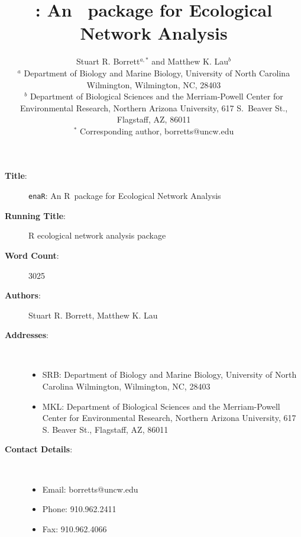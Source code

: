 \documentclass[11pt]{article}
\title{\enaR: An \R\ package for Ecological Network Analysis}
\author{Stuart R. Borrett$^{a,*}$ and Matthew K. Lau$^b$
  \\ {\footnotesize $^a$ Department of Biology and Marine Biology,
    University of North Carolina Wilmington, Wilmington, NC, 28403}
  \\ {\footnotesize $^b$ Department of Biological Sciences and the
    Merriam-Powell Center for Environmental Research, Northern Arizona
    University, 617 S.\ Beaver St., Flagstaff, AZ, 86011}
  \\ {\footnotesize $^*$ Corresponding author, borretts@uncw.edu} }
\newcommand{\R}{R}
\newcommand{\enaR}{\texttt{enaR}}
\begin{document}

\begin{description}
  \item[\textbf{Title}:] \enaR: An \R\ package for Ecological Network Analysis
  \item[\textbf{Running Title}:] R ecological network analysis package 
  \item[\textbf{Word Count}:] 3025
  \item[\textbf{Authors}:] Stuart R. Borrett, Matthew K. Lau
  \item[\textbf{Addresses}:] \
    \begin{itemize}
    \item SRB: Department of Biology and Marine Biology, University of
      North Carolina Wilmington, Wilmington, NC, 28403
    \item MKL: Department of Biological Sciences and the
      Merriam-Powell Center for Environmental Research, Northern
      Arizona University, 617 S. Beaver St., Flagstaff, AZ, 86011
    \end{itemize}
  \item[\textbf{Contact Details}:] \
    \begin{itemize}
    \item Email: borretts@uncw.edu
    \item Phone: 910.962.2411
    \item Fax: 910.962.4066
    \end{itemize}
\end{description}

\pagebreak

\maketitle
\end{document}
